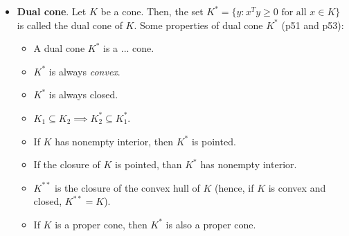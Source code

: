\documentclass[a4paper, oneside]{book}
\begin{document}
\begin{itemize}
\item \textbf{Dual cone}. Let $K$ be a cone. Then, the set $K^* = \{y : x^T y \ge 0 \text{ for all } x \in K\}$ is called the dual cone of $K$. Some properties of dual cone $K^*$ (p51 and p53):
	\begin{itemize}
	\item A dual cone $K^*$ is a ... cone.
	\item $K^*$ is always \textit{convex}. 
	\item $K^*$ is always closed.
	\item $K_1 \subseteq K_2 \implies K_2^* \subseteq K_1^*$.
	\item If $K$ has nonempty interior, then $K^*$ is pointed.
	\item If the closure of $K$ is pointed, than $K^*$ has nonempty interior.
	\item $K^{**}$ is the closure of the convex hull of $K$ (hence, if $K$ is convex and closed, $K^{**}=K$).
	\item If $K$ is a proper cone, then $K^*$ is also a proper cone.
	\end{itemize}
	

\end{itemize}
\end{document}
